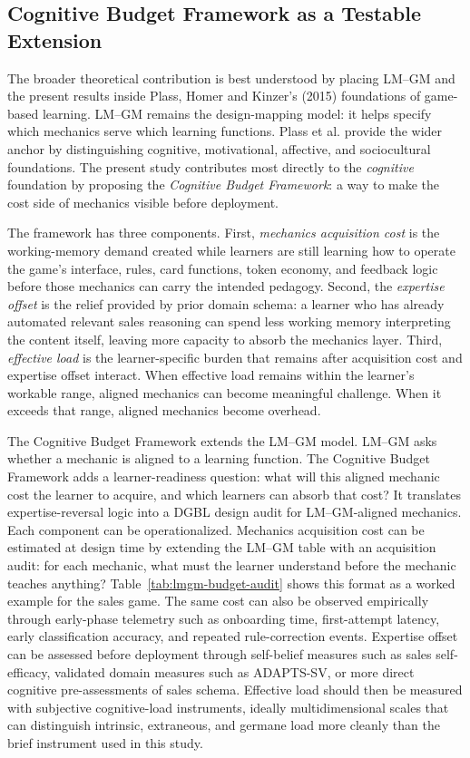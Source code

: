 \documentclass[12pt]{report}
\begin{document}
\subsection{Cognitive Budget Framework as a Testable Extension}
\label{sec:cbf}
The broader theoretical contribution is best understood by placing LM--GM and the present results inside Plass, Homer and Kinzer's (2015) foundations of game-based learning. LM--GM remains the design-mapping model: it helps specify which mechanics serve which learning functions. Plass et al. provide the wider anchor by distinguishing cognitive, motivational, affective, and sociocultural foundations. The present study contributes most directly to the \textit{cognitive} foundation by proposing the \textit{Cognitive Budget Framework}: a way to make the cost side of mechanics visible before deployment.

The framework has three components. First, \textit{mechanics acquisition cost} is the working-memory demand created while learners are still learning how to operate the game's interface, rules, card functions, token economy, and feedback logic before those mechanics can carry the intended pedagogy. Second, the \textit{expertise offset} is the relief provided by prior domain schema: a learner who has already automated relevant sales reasoning can spend less working memory interpreting the content itself, leaving more capacity to absorb the mechanics layer. Third, \textit{effective load} is the learner-specific burden that remains after acquisition cost and expertise offset interact. When effective load remains within the learner's workable range, aligned mechanics can become meaningful challenge. When it exceeds that range, aligned mechanics become overhead.

The Cognitive Budget Framework extends the LM--GM model. LM--GM asks whether a mechanic is aligned to a learning function. The Cognitive Budget Framework adds a learner-readiness question: what will this aligned mechanic cost the learner to acquire, and which learners can absorb that cost? It translates expertise-reversal logic into a DGBL design audit for LM--GM-aligned mechanics. Each component can be operationalized. Mechanics acquisition cost can be estimated at design time by extending the LM--GM table with an acquisition audit: for each mechanic, what must the learner understand before the mechanic teaches anything? Table~\ref{tab:lmgm-budget-audit} shows this format as a worked example for the sales game. The same cost can also be observed empirically through early-phase telemetry such as onboarding time, first-attempt latency, early classification accuracy, and repeated rule-correction events. Expertise offset can be assessed before deployment through self-belief measures such as sales self-efficacy, validated domain measures such as ADAPTS-SV, or more direct cognitive pre-assessments of sales schema. Effective load should then be measured with subjective cognitive-load instruments, ideally multidimensional scales that can distinguish intrinsic, extraneous, and germane load more cleanly than the brief instrument used in this study.
\end{document}
